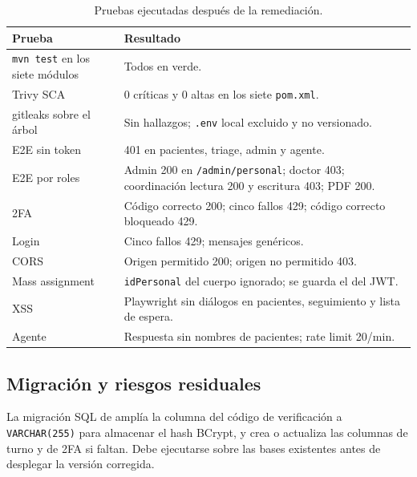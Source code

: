 \begin{table}[htbp]
\centering
\caption{Pruebas ejecutadas después de la remediación.}
\label{tab:pruebas-remediacion}
\small
\setlength{\tabcolsep}{3pt}
\begin{tabular}{@{}L{5.0cm}L{10.2cm}@{}}
\toprule
\textbf{Prueba} & \textbf{Resultado}\\
\midrule
\texttt{mvn test} en los siete módulos & Todos en verde.\\
Trivy SCA & 0 críticas y 0 altas en los siete \texttt{pom.xml}.\\
gitleaks sobre el árbol & Sin hallazgos; \texttt{.env} local excluido y no versionado.\\
E2E sin token & 401 en pacientes, triage, admin y agente.\\
E2E por roles & Admin 200 en \texttt{/admin/personal}; doctor 403; coordinación lectura 200 y escritura 403; PDF 200.\\
2FA & Código correcto 200; cinco fallos 429; código correcto bloqueado 429.\\
Login & Cinco fallos 429; mensajes genéricos.\\
CORS & Origen permitido 200; origen no permitido 403.\\
Mass assignment & \texttt{idPersonal} del cuerpo ignorado; se guarda el del JWT.\\
XSS & Playwright sin diálogos en pacientes, seguimiento y lista de espera.\\
Agente & Respuesta sin nombres de pacientes; rate limit 20/min.\\
\bottomrule
\end{tabular}
\end{table}

\subsection{Migración y riesgos residuales}

La migración SQL de  amplía la columna del código de
verificación a \texttt{VARCHAR(255)} para almacenar el hash BCrypt, y crea o
actualiza las columnas de turno y de 2FA si faltan. Debe ejecutarse sobre las bases
existentes antes de desplegar la versión corregida.

